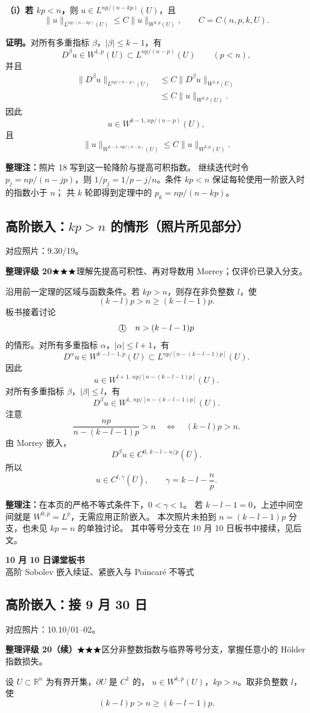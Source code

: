 \documentclass[UTF8,a4paper,11pt,fontset=fandol]{ctexart}
\newcommand{\R}{\mathbb R}
\newcommand{\ednote}[1]{\par{\small\color{notegray}\textbf{整理注：}#1}\par}
\newcommand{\source}[1]{{\small\color{notegray}对应照片：#1。}\par}
\newcommand{\proofstars}[1]{\ensuremath{%
\ifnum#1>0\relax\bigstar\fi
\ifnum#1>1\relax\bigstar\fi
\ifnum#1>2\relax\bigstar\fi
\ifnum#1>3\relax\bigstar\fi
\ifnum#1>4\relax\bigstar\fi}}
\newcommand{\proofrating}[3]{\par{\small\color{proofblue}%
\textbf{整理评级 #1}\enspace\proofstars{#2}\quad #3\par}}
\begin{document}
\textbf{（i）若 $kp<n$，}则 $u\in L^{np/(n-kp)}(U)$，且
\[
\boxed{\|u\|_{L^{np/(n-kp)}(U)}
\leq C\|u\|_{W^{k,p}(U)},\qquad C=C(n,p,k,U).}
\]

\textbf{证明。}对所有多重指标 $\beta$，$|\beta|\leq k-1$，有
\[
D^\beta u\in W^{1,p}(U)\subset L^{np/(n-p)}(U)
\qquad(p<n),
\]
并且
\[
\begin{aligned}
\|D^\beta u\|_{L^{np/(n-p)}(U)}
&\leq C\|D^\beta u\|_{W^{1,p}(U)}\\
&\leq C\|u\|_{W^{k,p}(U)}.
\end{aligned}
\]
因此
\[
u\in W^{k-1,\,np/(n-p)}(U),
\]
且
\[
\|u\|_{W^{k-1,\,np/(n-p)}(U)}
\leq C\|u\|_{W^{k,p}(U)}.
\]
\ednote{照片 18 写到这一轮降阶与提高可积指数。
继续迭代时令 $p_j=np/(n-jp)$，则
$1/p_j=1/p-j/n$。条件 $kp<n$ 保证每轮使用一阶嵌入时的指数小于 $n$；
共 $k$ 轮即得到定理中的 $p_k=np/(n-kp)$。}

\newpage
\subsection*{高阶嵌入：$kp>n$ 的情形（照片所见部分）}
\source{9.30/19}
\proofrating{20}{3}{理解先提高可积性、再对导数用 Morrey；仅评价已录入分支。}
沿用前一定理的区域与函数条件。若 $kp>n$，则存在非负整数 $l$，使
\[
(k-l)p>n\geq(k-l-1)p.
\]
板书接着讨论
\[
\text{\textcircled{1}}\quad n>(k-l-1)p
\]
的情形。对所有多重指标 $\alpha$，$|\alpha|\leq l+1$，有
\[
D^\alpha u\in W^{k-l-1,p}(U)
\subset L^{np/[n-(k-l-1)p]}(U).
\]
因此
\[
u\in W^{l+1,\,np/[n-(k-l-1)p]}(U).
\]
对所有多重指标 $\beta$，$|\beta|\leq l$，有
\[
D^\beta u\in W^{1,\,np/[n-(k-l-1)p]}(U).
\]
注意
\[
\frac{np}{n-(k-l-1)p}>n
\quad\Longleftrightarrow\quad (k-l)p>n.
\]
由 Morrey 嵌入，
\[
D^\beta u\in C^{0,\,k-l-n/p}(\overline U).
\]
所以
\[
\boxed{u\in C^{l,\gamma}(\overline U),\qquad
\gamma=k-l-\frac np.}
\]
\ednote{在本页的严格不等式条件下，$0<\gamma<1$。
若 $k-l-1=0$，上述中间空间就是 $W^{0,p}=L^p$，无需应用正阶嵌入。
本次照片未拍到 $n=(k-l-1)p$ 分支，也未见 $kp=n$ 的单独讨论。
其中等号分支在 10 月 10 日板书中接续，见后文。}

\newpage
{}
\begin{center}
{\LARGE\bfseries 10 月 10 日课堂板书}\\[5pt]
{高阶 Sobolev 嵌入续证、紧嵌入与 Poincaré 不等式}
\end{center}

\subsection*{高阶嵌入：接 9 月 30 日}
\source{10.10/01--02}
\proofrating{20（续）}{3}{区分非整数指数与临界等号分支，掌握任意小的 Hölder 指数损失。}
设 $U\subset\R^n$ 为有界开集，$\partial U$ 是 $C^1$ 的，
$u\in W^{k,p}(U)$，$kp>n$。取非负整数 $l$，使
\[
(k-l)p>n\geq(k-l-1)p.
\]
\end{document}
